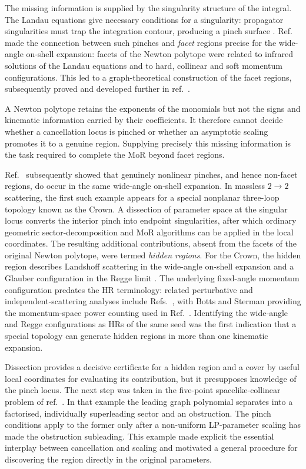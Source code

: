 \documentclass[a4paper,11pt]{article}
\begin{document}
The missing information is supplied by the singularity structure of the
integral.  The Landau equations give necessary conditions for a singularity:
propagator singularities must trap the integration contour, producing a
pinch surface \cite{Lnd59,Bjorken:1959fd,Nakanishi:1959jzx,
Collins:2020euz}.  Ref.~\cite{Gardi:2022khw} made the connection between such
pinches and \emph{facet} regions precise for the wide-angle on-shell
expansion: facets of the Newton polytope were related to infrared solutions
of the Landau equations and to hard, collinear and soft momentum
configurations.  This led to a graph-theoretical construction of the facet
regions, subsequently proved and developed further in
ref.~\cite{Ma:2023hrt}.

A Newton polytope retains the exponents of the monomials but not the signs and
kinematic information carried by their coefficients.  It therefore cannot
decide whether a cancellation locus is pinched or whether an asymptotic
scaling promotes it to a genuine region.  Supplying precisely this missing
information is the task required to complete the MoR beyond facet regions.

Ref.~\cite{Gardi:2024axt} subsequently showed that genuinely nonlinear
pinches, and hence non-facet regions, do occur in the same wide-angle on-shell
expansion.  In massless \(2\to2\) scattering, the first such example appears
for a special nonplanar three-loop topology known as the Crown.  A dissection
of parameter space at the singular locus
converts the interior pinch into endpoint singularities, after which ordinary
geometric sector-decomposition and MoR algorithms can be applied in the local
coordinates.  The resulting additional contributions, absent from the
facets of the original Newton polytope, were termed \emph{hidden regions}.
For the Crown, the hidden region describes Landshoff scattering in the
wide-angle on-shell expansion and a Glauber configuration in the Regge limit
\cite{Gardi:2024axt}.  The underlying fixed-angle momentum configuration
predates the HR terminology: related perturbative and independent-scattering
analyses include
Refs.~\cite{Halliday:1964fixedangle,Landshoff:1974wideangle,Botts:1989kf},
with Botts and Sterman providing the momentum-space power counting used in
Ref.~\cite{Gardi:2024axt}.  Identifying the wide-angle and Regge
configurations as HRs of the same seed was the first indication that a special
topology can generate hidden regions in more than one kinematic expansion.

Dissection provides a decisive certificate for a hidden region and a cover
by useful local coordinates for evaluating its contribution, but it presupposes knowledge
of the pinch locus.  The next step was taken in the five-point
spacelike-collinear problem of ref.~\cite{Chen:2026dnj}.  In that example the
leading graph polynomial separates into a factorised, individually
superleading sector and an obstruction.  The pinch conditions apply to the
former only after a non-uniform LP-parameter scaling has made the
obstruction subleading.  This example made explicit the essential interplay
between cancellation and scaling and motivated a general procedure for
discovering the region directly in the original parameters.
\end{document}
